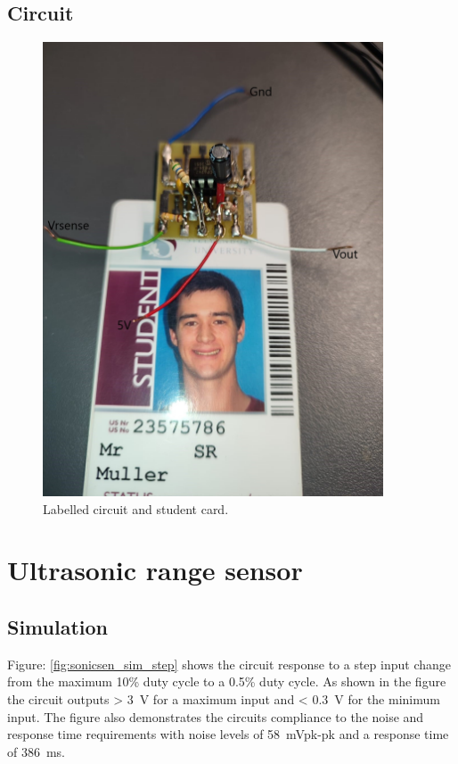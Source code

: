 \subsection{Circuit}
\begin{figure}[H]
\centering
\includegraphics[width = 0.9\textwidth]{./Figures/Cursens_Cir_Card.jpeg}
\caption{Labelled circuit and student card.}
\label{fig:cursen_cir_card}
\end{figure}

\clearpage
\section{Ultrasonic range sensor}
\subsection{Simulation}

Figure: \ref{fig:sonicsen_sim_step} shows the circuit response to a step input change from the maximum 10\% duty cycle to a 0.5\% duty cycle. As shown in the figure the circuit outputs > \SI{3}{\volt} for a maximum input and < \SI{0.3}{\volt} for the minimum input. The figure also demonstrates the circuits compliance to the noise and response time requirements with noise levels of \SI{58}{\milli\volt}pk-pk and a response time of \SI{386}{\milli\second}.

